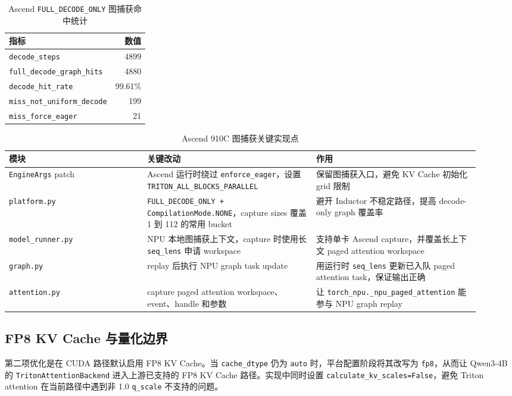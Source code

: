 \documentclass[UTF8,10.5pt]{ctexart}
\newcommand{\code}[1]{\texttt{#1}}
\begin{document}
\begin{table}[H]
\centering
\caption{Ascend \code{FULL\_DECODE\_ONLY} 图捕获命中统计}
\label{tab:ascend-graph-hit}
\begin{tabular}{lr}
\toprule
指标 & 数值 \\
\midrule
\code{decode\_steps} & 4899 \\
\code{full\_decode\_graph\_hits} & 4880 \\
\code{decode\_hit\_rate} & 99.61\% \\
\code{miss\_not\_uniform\_decode} & 199 \\
\code{miss\_force\_eager} & 21 \\
\bottomrule
\end{tabular}
\end{table}

\begin{table}[H]
\centering
\caption{Ascend 910C 图捕获关键实现点}
\label{tab:ascend-graph}
\begin{tabular}{p{0.27\linewidth}p{0.33\linewidth}p{0.32\linewidth}}
\toprule
模块 & 关键改动 & 作用 \\
\midrule
\code{EngineArgs} patch & Ascend 运行时绕过 \code{enforce\_eager}，设置 \code{TRITON\_ALL\_BLOCKS\_PARALLEL} & 保留图捕获入口，避免 KV Cache 初始化 grid 限制 \\
\code{platform.py} & \code{FULL\_DECODE\_ONLY + CompilationMode.NONE}，capture sizes 覆盖 1 到 112 的常用 bucket & 避开 Inductor 不稳定路径，提高 decode-only graph 覆盖率 \\
\code{model\_runner.py} & NPU 本地图捕获上下文，capture 时使用长 \code{seq\_lens} 申请 workspace & 支持单卡 Ascend capture，并覆盖长上下文 paged attention workspace \\
\code{graph.py} & replay 后执行 NPU graph task update & 用运行时 \code{seq\_lens} 更新已入队 paged attention task，保证输出正确 \\
\code{attention.py} & capture paged attention workspace、event、handle 和参数 & 让 \code{torch\_npu.\_npu\_paged\_attention} 能参与 NPU graph replay \\
\bottomrule
\end{tabular}
\end{table}

\subsection{FP8 KV Cache 与量化边界}

第二项优化是在 CUDA 路径默认启用 FP8 KV Cache。当 \code{cache\_dtype} 仍为 \code{auto} 时，平台配置阶段将其改写为 \code{fp8}，从而让 Qwen3-4B 的 \code{TritonAttentionBackend} 进入上游已支持的 FP8 KV Cache 路径。实现中同时设置 \code{calculate\_kv\_scales=False}，避免 Triton attention 在当前路径中遇到非 1.0 \code{q\_scale} 不支持的问题。
\end{document}
